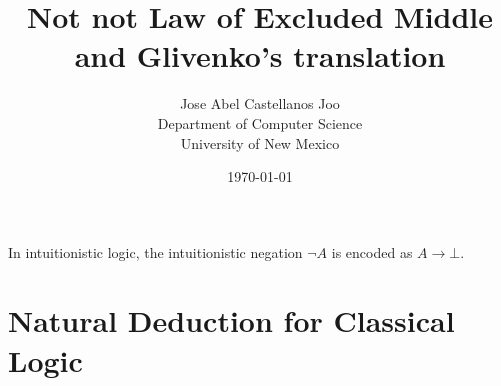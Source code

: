 \documentclass{article}
\begin{document}
\title{Not not Law of Excluded Middle and Glivenko's translation}
\author{Jose Abel Castellanos Joo\\Department of Computer Science\\University
of New Mexico\\}

\date{\today}
\maketitle

In intuitionistic logic, the intuitionistic negation $\neg A$ is encoded as $A
\rightarrow \bot$. 

\section{Natural Deduction for Classical Logic}
\end{document}
